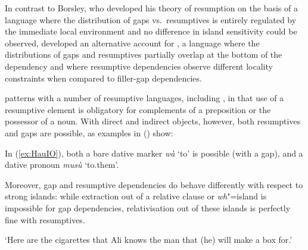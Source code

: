 \documentclass[output=paper,biblatex,babelshorthands,newtxmath,draftmode,colorlinks,citecolor=brown]{langscibook}
\begin{document}
In contrast to Borsley, who developed his theory of resumption on the
basis of a language where the distribution of gaps vs.\ resumptives is
entirely regulated by the immediate local environment and no
difference in island sensitivity could be observed,
\citet{Crysmann:12} developed an alternative account for , a
language where the distributions of gaps and resumptives partially
overlap at the bottom of the dependency and where resumptive
dependencies observe different locality constraints when compared to
filler-gap dependencies.

\largerpage
{} patterns with a number of resumptive languages, including , in that use of a
resumptive element is obligatory for
complements of a preposition or the possessor of a noun. With direct and indirect objects, however,
both resumptives and gaps are possible, as  examples in () show: 

\eal
\label{ex:HauIO}
\zl


\noindent
In (\ref{ex:HauIO}), both a bare dative marker \textit{wà} `to' is
possible (with a gap), and a dative pronoun \textit{musù} `to.them'.

Moreover, gap and resumptive dependencies do behave differently with
respect to strong islands: while extraction out of a relative clause
or \emph{wh}"=island is impossible for gap dependencies,
relativisation out of these islands is perfectly fine with
resumptives.

\ea
\label{ex:HauResLongIO}
    \glt `Here are the cigarettes that Ali knows the man that (he) will make a box for.'
\z
\end{document}
